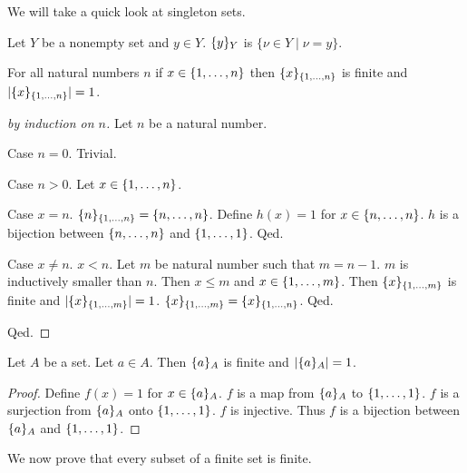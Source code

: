 \documentclass{article}
\begin{document}
%
We will take a quick look at singleton sets.
%
\begin{forthel}
	\begin{definition}
		Let $Y$ be a nonempty set and $y \in Y$. 
		$\{y\}_{Y}$ is $\{\nu \in Y \mid \nu=y \}$.
	\end{definition}
	
	\begin{lemma}
		For all natural numbers $n$
		if $x \in \{1,\dots,n\}$
		then $\{x\}_{\{1,\dots,n\}}$ is finite and $|\{x\}_{\{1,\dots,n\}}| = 1$. 
	\end{lemma}
	\begin{proof}[by induction on $n$]
		Let $n$ be a natural number.
		
		Case $n=0$. Trivial.
		
		Case $n > 0$. 
		Let $x \in \{1,\dots,n\}$. 
		
		Case $x = n$. 
		$\{n\}_{\{1,\dots,n\}} = \{n,\dots,n\}$.
		Define $h(x) = 1$ for $x \in \{n,\dots,n\}$. 
		$h$ is a bijection between $\{n,\dots,n\}$ and $\{1,\dots,1\}$. 
		Qed.
		
		Case $x \neq n$.
		$x < n$.
		Let $m$ be natural number such that $m = n-1$.
		$m$ is inductively smaller than $n$.
		Then $x \leq m$ and $x \in \{1,\dots,m\}$.
		Then $\{x\}_{\{1,\dots,m\}}$ is finite and $|\{x\}_{\{1,\dots,m\}}|=1$.
		$\{x\}_{\{1,\dots,m\}}=\{x\}_{\{1,\dots,n\}}$.
		Qed.
		
		Qed.
	\end{proof}
	
	\begin{lemma}
		Let $A$ be a set. Let $a\in A$. Then $\{a\}_{A}$ is finite and $| \{a\}_{A} | = 1$.
	\end{lemma}
	\begin{proof}
		Define $f(x) = 1$ for $x \in \{a\}_{A}$.
		$f$ is a map from $\{a\}_{A}$ to $\{1,\dots,1\}$.
		$f$ is a surjection from $\{a\}_{A}$ onto $\{1,\dots,1\}$.
		$f$ is injective.
		Thus $f$ is a bijection between $\{a\}_{A}$ and $\{1,\dots,1\}$.
	\end{proof}
	
\end{forthel}
%
We now prove that every subset of a finite set is finite.
%
\end{document}
